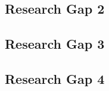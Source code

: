 \subsection{Research Gap 2}

\lipsum[3-3]

\subsection{Research Gap 3}

\lipsum[4-4]

\subsection{Research Gap 4}

\lipsum[5-5]